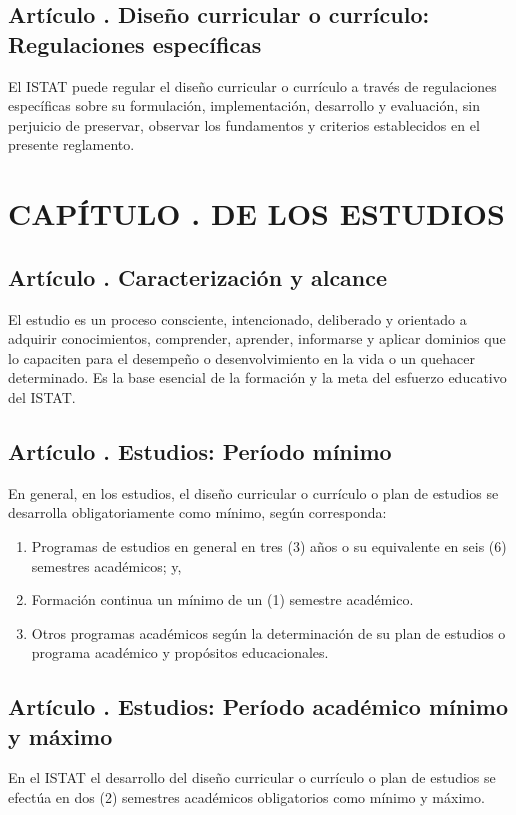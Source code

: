 \subsection{Artículo . Diseño curricular o currículo: Regulaciones específicas}
\addtocounter{ns}{1}
El ISTAT puede regular el diseño curricular o currículo a través de regulaciones específicas sobre su formulación, implementación, desarrollo y evaluación, sin perjuicio de preservar, observar los fundamentos y criterios establecidos en el presente reglamento. 
\section{CAPÍTULO . DE LOS ESTUDIOS}
\addtocounter{re}{1}

\subsection{Artículo . Caracterización y alcance}
\addtocounter{ns}{1}
El estudio es un proceso consciente, intencionado, deliberado y orientado a adquirir conocimientos, comprender, aprender, informarse y aplicar dominios que lo capaciten para el desempeño o desenvolvimiento en la vida o un quehacer determinado. Es la base esencial de la formación y la meta del esfuerzo educativo del ISTAT.
\subsection{Artículo . Estudios: Período mínimo}
\addtocounter{ns}{1}
En general, en los estudios, el diseño curricular o currículo o plan de estudios se desarrolla obligatoriamente como mínimo, según corresponda: 
\begin{enumerate}
\item Programas de estudios en general en tres (3) años o su equivalente en seis (6) semestres académicos; y, 
\item Formación continua un mínimo de un (1) semestre académico. 
\item Otros programas académicos según la determinación de su plan de estudios o programa académico y propósitos educacionales. 
\end{enumerate}
\subsection{Artículo . Estudios: Período académico mínimo y máximo}
\addtocounter{ns}{1}
En el ISTAT el desarrollo del diseño curricular o currículo o plan de estudios se efectúa en dos (2) semestres académicos obligatorios como mínimo y máximo.  
